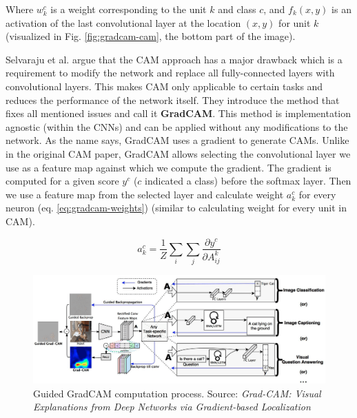Where $w_k^c$ is a weight corresponding to the unit $k$ and class $c$, and $f_k(x,y)$ is an activation of the last convolutional layer at the location $(x,y)$ for unit $k$ (visualized in Fig. \ref{fig:gradcam-cam}, the bottom part of the image).

\vspace{\baselineskip}

Selvaraju et al. argue that the CAM approach has a major drawback which is a requirement to modify the network and replace all fully-connected layers with convolutional layers. This makes CAM only applicable to certain tasks and reduces the performance of the network itself. They introduce the method that fixes all mentioned issues and call it \textbf{GradCAM}. This method is implementation agnostic (within the CNNs) and can be applied without any modifications to the network. As the name says, GradCAM uses a gradient to generate CAMs. Unlike in the original CAM paper, GradCAM allows selecting the convolutional layer we use as a feature map against which we compute the gradient. The gradient is computed for a given score $y^c$ ($c$ indicated a class) before the softmax layer. Then we use a feature map from the selected layer and calculate weight $a_k^c$ for every neuron (eq. \ref{eq:gradcam-weights}) (similar to calculating weight for every unit in CAM).

\begin{equation}
    a_k^c = \frac{1}{Z} \sum_{i} \sum_{j} \frac{\partial y^c}{\partial A_{ij}^k}
    \label{eq:gradcam-weights}
\end{equation}

\begin{figure}[ht]
    \centering
    \includegraphics[width=\textwidth]{methods/images/guided-gradcam.png}
 \caption{Guided GradCAM computation process. Source: \textit{Grad-CAM: Visual Explanations from Deep Networks via Gradient-based Localization} \cite{selvaraju2017grad} }\label{fig:gradcam-guided-gradcam}
\end{figure}

